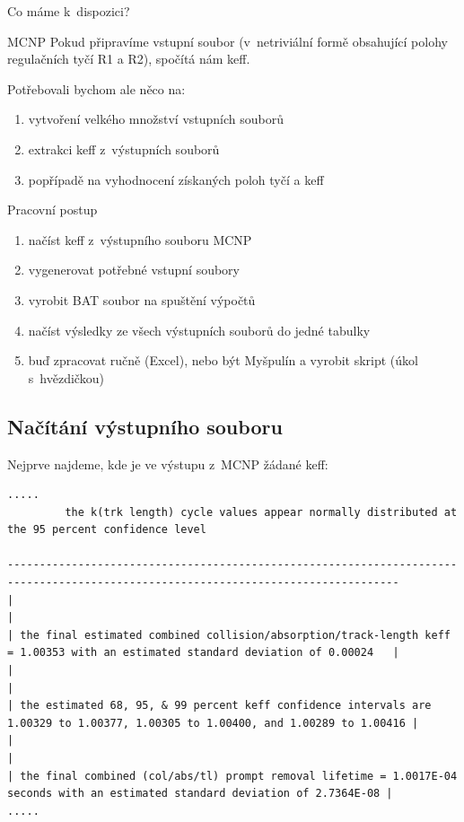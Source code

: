 \documentclass{beamer}
\begin{document}
\begin{frame}{Co máme k~dispozici?}
  \begin{block}{MCNP}
    Pokud připravíme vstupní soubor (v~netriviální formě obsahující polohy regulačních tyčí R1 a R2), spočítá nám keff.
  \end{block}
  Potřebovali bychom ale něco na:
  \begin{enumerate}
    \item vytvoření velkého množství vstupních souborů
    \item extrakci keff z~výstupních souborů
    \item popřípadě na vyhodnocení získaných poloh tyčí a keff
  \end{enumerate}
\end{frame}

\begin{frame}{Pracovní postup}
  \begin{enumerate}
    \item načíst keff z~výstupního souboru MCNP
    \pause
    \item vygenerovat potřebné vstupní soubory
    \pause
    \item vyrobit BAT soubor na spuštění výpočtů
    \pause
    \item načíst výsledky ze všech výstupních souborů do jedné tabulky
    \pause
    \item buď zpracovat ručně (Excel), nebo být Myšpulín a vyrobit skript (úkol s~hvězdičkou)
  \end{enumerate}
\end{frame}

\subsection{Načítání výstupního souboru}

\begin{frame}[fragile]{}
  Nejprve najdeme, kde je ve výstupu z~MCNP žádané keff:
  {\tiny
  \begin{verbatim}
.....
         the k(trk length) cycle values appear normally distributed at the 95 percent confidence level

-----------------------------------------------------------------------------------------------------------------------------------
|                                                                                                                                 |
| the final estimated combined collision/absorption/track-length keff = 1.00353 with an estimated standard deviation of 0.00024   |
|                                                                                                                                 |
| the estimated 68, 95, & 99 percent keff confidence intervals are 1.00329 to 1.00377, 1.00305 to 1.00400, and 1.00289 to 1.00416 |
|                                                                                                                                 |
| the final combined (col/abs/tl) prompt removal lifetime = 1.0017E-04 seconds with an estimated standard deviation of 2.7364E-08 |
.....
  \end{verbatim}
  }
\end{frame}
\end{document}
